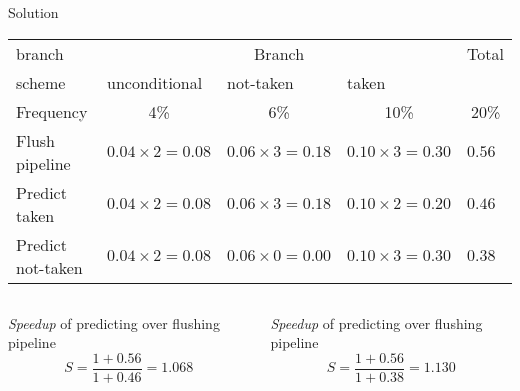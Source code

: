 \begin{frame}[t]{Solution}

{\scriptsize
\begin{tabular}[c]{|p{}|*{3}{p{}|}p{}|}
\hline
branch &  \multicolumn{3}{c|}{Branch} & \multicolumn{1}{c|}{Total}
\\
\cline{2-4}
scheme & unconditional & not-taken & taken &
\\
\hline\hline

Frequency &
\multicolumn{1}{c|}{4\%} &
\multicolumn{1}{c|}{6\%} &
\multicolumn{1}{c|}{10\%} &
\multicolumn{1}{c|}{20\%} 
\\
\hline

Flush pipeline &
$0.04 \times 2 = 0.08$ &
$0.06 \times 3 = 0.18$ &
$0.10 \times 3 = 0.30$ &
$0.56$
\\
\hline

Predict taken &
$0.04 \times 2 = 0.08$ &
$0.06 \times 3 = 0.18$ &
$0.10 \times 2 = 0.20$ &
$0.46$
\\
\hline

Predict not-taken &
$0.04 \times 2 = 0.08$ &
$0.06 \times 0 = 0.00$ &
$0.10 \times 3 = 0.30$ &
$0.38$
\\
\hline

\hline
\end{tabular}
}
\begin{center}
\end{center}

\begin{columns}

\begin{column}{.49\textwidth}
{\footnotesize
\emph{Speedup} of predicting  over flushing pipeline
}
\begin{displaymath}
S =
\frac{1 + 0.56}{1 + 0.46} =
1.068
\end{displaymath}
\end{column}

\begin{column}{.49\textwidth}
{\footnotesize
\emph{Speedup} of predicting  over flushing pipeline
}
\begin{displaymath}
S =
\frac{1 + 0.56}{1 + 0.38} =
1.130
\end{displaymath}
\end{column}

\end{columns}

\end{frame}
